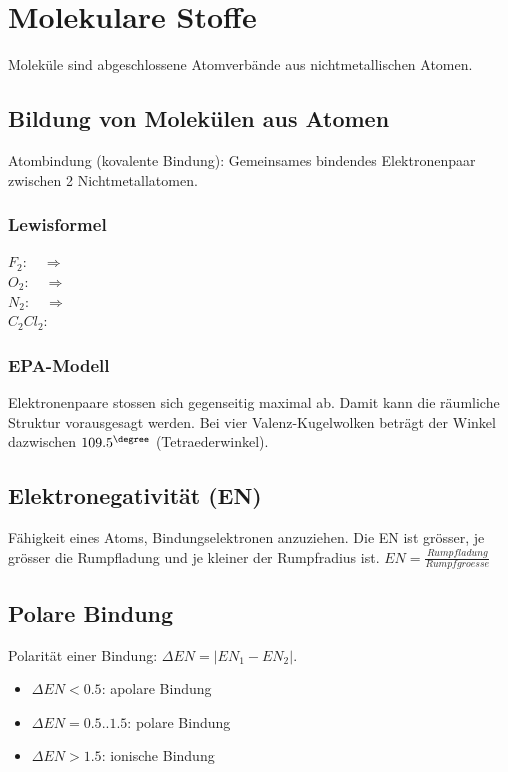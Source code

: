 \section{Molekulare Stoffe}
Moleküle sind abgeschlossene Atomverbände aus nichtmetallischen Atomen. 

\subsection{Bildung von Molekülen aus Atomen}
Atombindung (kovalente Bindung): Gemeinsames bindendes Elektronenpaar zwischen 2 Nichtmetallatomen. 

\subsubsection{Lewisformel}
\begin{multicols}{2}
$F_2$: \   $\Rightarrow$   \\
$O_2$: \  $\Rightarrow$  \\
$N_2$: \  $\Rightarrow$  \\
$C_2Cl_2$: \ 
\end{multicols}

\subsubsection{EPA-Modell}
Elektronenpaare stossen sich gegenseitig maximal ab. Damit kann die räumliche Struktur vorausgesagt werden. Bei vier Valenz-Kugelwolken beträgt der Winkel dazwischen $109.5^\degree$ (Tetraederwinkel).

\subsection{Elektronegativität (EN)}
Fähigkeit eines Atoms, Bindungselektronen anzuziehen. Die EN ist grösser, je grösser die Rumpfladung und je kleiner der Rumpfradius ist. $EN=\frac{Rumpfladung}{Rumpfgroesse}$

\subsection{Polare Bindung}
Polarität einer Bindung: $\Delta EN = | EN_{1} - EN_{2} |$. 
\begin{itemize}
	\item $\Delta EN < 0.5$: apolare Bindung
	\item $\Delta EN = 0.5 .. 1.5$: polare Bindung
	\item $\Delta EN > 1.5$: ionische Bindung
\end{itemize}

